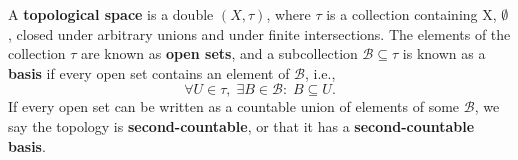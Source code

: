 \documentclass[../fractals_everywhere.tex]{subfiles}
\begin{document}
\begin{tcolorbox}[
		skin=enhanced,
		title=Reminder!,
		after title={\hfill Topological space with second countable base},
		fonttitle=\bfseries,
		sharp corners=downhill,
		colframe=black,
		colbacktitle=yellow!75!white,
		colback=yellow!30,
		colbacklower=black,
		coltitle=black,
		drop large lifted shadow
	]
	A \textbf{topological space} is a double \((X, \tau )\), where \(\tau \) is a collection containing X, \(\emptyset \), closed under arbitrary unions and under finite intersections. The elements of the collection \(\tau \) are known as \textbf{open sets}, and a subcollection \(\mathcal{B}\subseteq \tau \) is known as a \textbf{basis} if every open set contains an element of \(\mathcal{B}\), i.e.,
	\[
		\forall U\in \tau ,\; \exists  B\in \mathcal{B}:\; B\subseteq U.
	\]
	If every open set can be written as a \hypertarget{2nd_countable}{countable union of elements} of some \(\mathcal{B}\), we say the topology is \textbf{second-countable}, or that it has a \textbf{second-countable basis}.
\end{tcolorbox}
\end{document}
